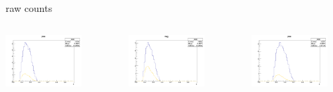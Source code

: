 \begin{frame}{raw counts}
\begin{columns}
\begin{column}[T]{0.25\textwidth}
\includegraphics[width = 0.7\textwidth]{results/yield/statistics/yield_x_Q2_z_0.55_5.500_0.45_pos.png}
\end{column}
\begin{column}[T]{0.25\textwidth}
\includegraphics[width = 0.7\textwidth]{results/yield/statistics/yield_x_Q2_z_0.55_5.500_0.45_neg.png}
\end{column}
\begin{column}[T]{0.25\textwidth}
\includegraphics[width = 0.7\textwidth]{results/yield/statistics/yield_x_Q2_z_0.55_5.500_0.55_pos.png}

\end{column}
\end{columns}
\end{frame}

